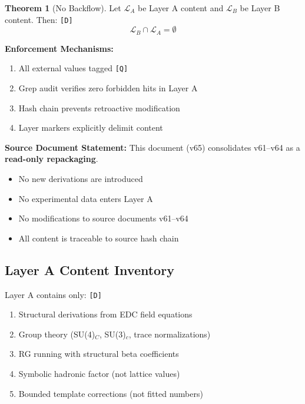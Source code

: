 \documentclass[11pt,a4paper]{article}
\newcommand{\tagD}{\textcolor{green!50!black}{\texttt{[D]}}}
\newcommand{\tagQ}{\textcolor{red!70!black}{\texttt{[Q]}}}
\theoremstyle{definition}
\newtheorem{theorem}{Theorem}[section]
\begin{document}
\begin{nobackflowbox}
\begin{theorem}[No Backflow]
\label{thm:no-backflow}
Let $\mathcal{L}_A$ be Layer A content and $\mathcal{L}_B$ be Layer B content. Then: \tagD{}
\begin{equation}
\label{eq:no-backflow-set}
\boxed{\mathcal{L}_B \cap \mathcal{L}_A = \emptyset}
\end{equation}
\end{theorem}

\textbf{Enforcement Mechanisms:}
\begin{enumerate}
  \item All external values tagged \tagQ{}
  \item Grep audit verifies zero forbidden hits in Layer A
  \item Hash chain prevents retroactive modification
  \item Layer markers explicitly delimit content
\end{enumerate}

\textbf{Source Document Statement:}
This document (v65) consolidates v61--v64 as a \textbf{read-only repackaging}.
\begin{itemize}
  \item No new derivations are introduced
  \item No experimental data enters Layer A
  \item No modifications to source documents v61--v64
  \item All content is traceable to source hash chain
\end{itemize}
\end{nobackflowbox}

\subsection{Layer A Content Inventory}
\label{subsec:layer-a-inventory}

Layer A contains only: \tagD{}
\begin{enumerate}
  \item Structural derivations from EDC field equations
  \item Group theory (SU(4)$_C$, SU(3)$_c$, trace normalizations)
  \item RG running with structural beta coefficients
  \item Symbolic hadronic factor (not lattice values)
  \item Bounded template corrections (not fitted numbers)
\end{enumerate}
\end{document}
